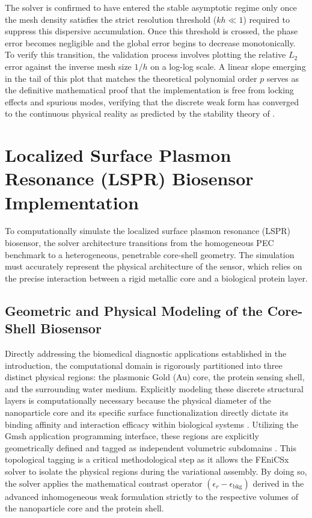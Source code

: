 The solver is confirmed to have entered the stable asymptotic regime only once the mesh density satisfies the strict resolution threshold ($kh \ll 1$) required to suppress this dispersive accumulation. Once this threshold is crossed, the phase error becomes negligible and the global error begins to decrease monotonically. To verify this transition, the validation process involves plotting the relative $L_2$ error against the inverse mesh size $1/h$ on a log-log scale. A linear slope emerging in the tail of this plot that matches the theoretical polynomial order $p$ serves as the definitive mathematical proof that the implementation is free from locking effects and spurious modes, verifying that the discrete weak form has converged to the continuous physical reality as predicted by the stability theory of \citet{Hazard1996}.

\section{Localized Surface Plasmon Resonance (LSPR) Biosensor Implementation}

To computationally simulate the localized surface plasmon resonance (LSPR) biosensor, the solver architecture transitions from the homogeneous PEC benchmark to a heterogeneous, penetrable core-shell geometry. The simulation must accurately represent the physical architecture of the sensor, which relies on the precise interaction between a rigid metallic core and a biological protein layer.

\subsection{Geometric and Physical Modeling of the Core-Shell Biosensor}

Directly addressing the biomedical diagnostic applications established in the introduction, the computational domain is rigorously partitioned into three distinct physical regions: the plasmonic Gold (Au) core, the protein sensing shell, and the surrounding water medium. Explicitly modeling these discrete structural layers is computationally necessary because the physical diameter of the nanoparticle core and its specific surface functionalization directly dictate its binding affinity and interaction efficacy within biological systems \citep{Das2023}. Utilizing the Gmsh application programming interface, these regions are explicitly geometrically defined and tagged as independent volumetric subdomains \citep{Das2023}. This topological tagging is a critical methodological step as it allows the FEniCSx solver to isolate the physical regions during the variational assembly. By doing so, the solver applies the mathematical contrast operator $(\epsilon_r - \epsilon_{\text{bkg}})$ derived in the advanced inhomogeneous weak formulation strictly to the respective volumes of the nanoparticle core and the protein shell.

